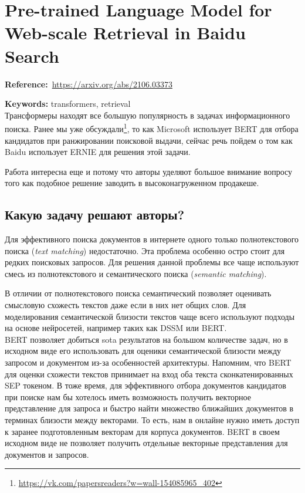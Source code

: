 \chapter{Pre-trained Language Model for Web-scale Retrieval in Baidu Search}

\textbf{Reference:}~\url{https://arxiv.org/abs/2106.03373}

\textbf{Keywords:} transformers, retrieval \\

Трансформеры находят все большую популярность в задачах информационного поиска.
Ранее мы уже обсуждали\footnote{\url{https://vk.com/papersreaders?w=wall-154085965_402}}, то как Microsoft использует BERT для отбора кандидатов при ранжировании поисковой выдачи, сейчас речь пойдем о том как Baidu использует ERNIE для решения этой задачи.

Работа интересна еще и потому что авторы уделяют большое внимание вопросу того как подобное решение заводить в высоконагруженном продакеше.

\section*{Какую задачу решают авторы?}

Для эффективного поиска документов в интернете одного только полнотекстового поиска (\textit{text matching}) недостаточно. Эта проблема особенно остро стоит для редких поисковых запросов. 
Для решения данной проблемы все чаще используют смесь из полнотекстового и семантического поиска (\textit{semantic matching}).

В отличии от полнотекстового поиска семантический позволяет оценивать смысловую схожесть текстов даже если в них нет общих слов.
Для моделирования семантической близости текстов чаще всего используют подходы на основе нейросетей, например таких как DSSM или BERT. \\

BERT позволяет добиться sota результатов на большом количестве задач, но в исходном виде его использовать для оценики семантической близости между запросом и документом из-за особенностей архитектуры.
Напомним, что BERT для оценки схожести текстов принимает на вход оба текста сконкатенированных SEP токеном. 
В тоже время, для эффективного отбора документов кандидатов при поиске нам бы хотелось иметь возможность получить векторное представление для запроса и быстро найти множество ближайших документов в терминах близости между векторами. 
То есть, нам в онлайне нужно иметь доступ к заранее подготовленным векторам для корпуса документов.
BERT в своем исходном виде не позволяет получить отдельные векторные представления для документов и запросов. \\

